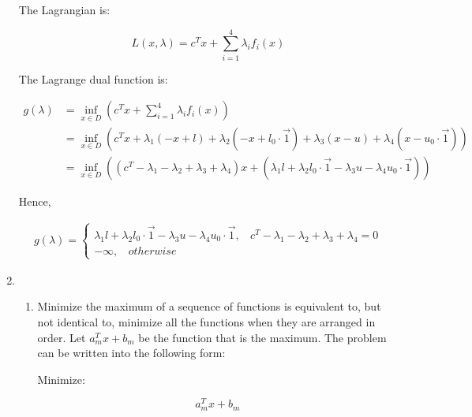 \documentclass[11pt, letterpaper, titlepage]{article}
\begin{document}
\begin{enumerate}
    The Lagrangian is:
    
    \begin{equation*}
        L(x, \lambda) = c^T x + \sum_{i = 1}^{4} \lambda_i f_i (x)
    \end{equation*}
    
    The Lagrange dual function is:
    
    \begin{equation*}
        \begin{aligned}
            g(\lambda) &= \inf_{x \in D} (c^T x + \sum_{i = 1}^{4} \lambda_i f_i (x)) \\
            &= \inf_{x \in D} (c^T x + \lambda_1(- x + l) + \lambda_2(- x + l_0 \cdot \Vec{1}) + \lambda_3(x - u) + \lambda_4(x - u_0 \cdot \Vec{1})) \\
            &= \inf_{x \in D} ((c^T - \lambda_1 - \lambda_2 + \lambda_3 + \lambda_4) x + (\lambda_1 l + \lambda_2 l_0 \cdot \Vec{1} - \lambda_3 u - \lambda_4 u_0 \cdot \Vec{1}))
        \end{aligned}
    \end{equation*}
    
    Hence,

    \begin{gather*}
    g (\lambda) =
        \begin{cases}
            \lambda_1 l + \lambda_2 l_0 \cdot \Vec{1} - \lambda_3 u - \lambda_4 u_0 \cdot \Vec{1} ,\ \ \ \  c^T - \lambda_1 - \lambda_2 + \lambda_3 + \lambda_4 = 0 \\
            - \infty ,\ \ \ \  otherwise
        \end{cases}
    \end{gather*}
    
    \item %
    
    \begin{enumerate}
        
        \item %
        
        Minimize the maximum of a sequence of functions is equivalent to, but not identical to, minimize all the functions when they are arranged in order. Let $a_m^T x + b_m$ be the function that is the maximum. The problem can be written into the following form:
        
        Minimize:
        
        \begin{equation*}
            a_m^T x + b_m
        \end{equation*}
        

\end{enumerate}
\end{enumerate}
\end{document}
